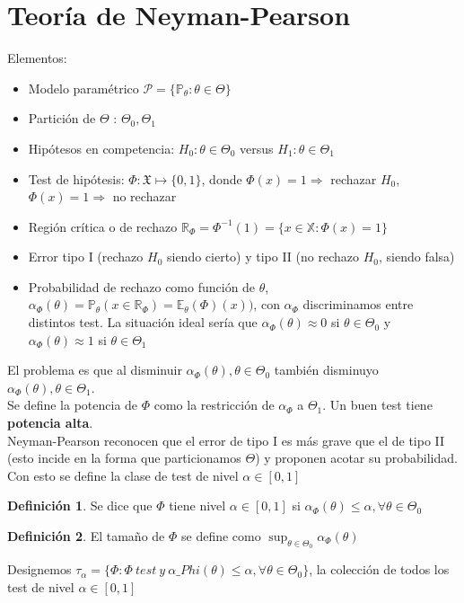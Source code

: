 \documentclass[10pt]{article}
\theoremstyle{plain}
\theoremstyle{definition}
\newtheorem{defi}{Definición}
\begin{document}
\section{Teoría de Neyman-Pearson}
Elementos:
\begin{itemize}
\item Modelo paramétrico $\mathcal{P} = \{\mathbb{P}_{\theta}\colon \theta \in \Theta\}$
\item Partición de $\Theta$ : $\Theta_{0},\Theta_{1}$
\item Hipótesos en competencia: $H_{0}: \theta \in \Theta_{0}$ versus $H_{1}: \theta \in \Theta_{1}$
\item Test de hipótesis: $\Phi: \mathfrak{X} \mapsto \{0,1\}$, donde $\Phi(x) = 1\Rightarrow$ rechazar $H_{0}$, $\Phi(x) = 1\Rightarrow$ no rechazar
\item Región crítica o de rechazo $\mathbb{R}_{\Phi} = \Phi^{-1}(1) = \{x \in \mathbb{X}\colon \Phi(x) = 1\}$
\item Error tipo I (rechazo $H_{0}$ siendo cierto) y tipo II (no rechazo $H_{0}$, siendo falsa)
\item Probabilidad de rechazo como función de $\theta$, $\alpha_{\Phi}(\theta) = \mathbb{P}_{\theta}(x \in \mathbb{R}_{\Phi}) = \mathbb{E}_{\theta}(\Phi)(x))$, con $\alpha_{\Phi}$ discriminamos entre distintos test. La situación ideal sería que $\alpha_{\Phi}(\theta) \approx 0$ si $\theta \in \Theta_{0}$ y $\alpha_{\Phi}(\theta) \approx 1$ si $\theta \in \Theta_{1}$
\end{itemize}
El problema es que al disminuir $\alpha_{\Phi}(\theta), \theta \in \Theta_{0}$ también disminuyo $\alpha_{\Phi}(\theta), \theta \in \Theta_{1}$.\\

Se define la potencia de $\Phi$ como la restricción de $\alpha_{\Phi}$ a $\Theta_{1}$. Un buen test tiene \textbf{potencia alta}.\\

Neyman-Pearson reconocen que el error de tipo I es más grave que el de tipo II (esto incide en la forma que particionamos $\Theta$) y proponen acotar su probabilidad.\\
Con esto se define la clase de test de nivel $\alpha \in [0,1]$
\begin{defi} Se dice que $\Phi$ tiene nivel $\alpha \in [0,1]$ si $\alpha_{\Phi}(\theta) \le \alpha, \forall \theta \in \Theta_{0}$
\end{defi}
\begin{defi} El tamaño de $\Phi$ se define como $\sup_{\theta \in \Theta_{0}} \alpha_{\Phi}(\theta)$
\end{defi}
Designemos $\tau_{\alpha} = \{\Phi\colon \Phi\ test\ y\ \alpha\_{Phi}(\theta) \le \alpha, \forall \theta \in \Theta_{0}\}$, la colección de todos los test de nivel $\alpha \in [0,1]$
\end{document}
